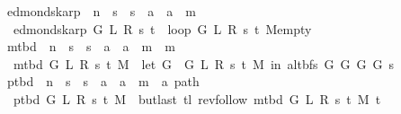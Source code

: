\begin{isabellebody}
\ edmonds{\isacharunderscore}{\kern0pt}karp\ {\isacharcolon}{\kern0pt}{\isacharcolon}{\kern0pt}\ {\isachardoublequoteopen}{\isacharprime}{\kern0pt}n\ {\isasymRightarrow}\ {\isacharprime}{\kern0pt}s\ {\isasymRightarrow}\ {\isacharprime}{\kern0pt}s\ {\isasymRightarrow}\ {\isacharprime}{\kern0pt}a\ {\isasymRightarrow}\ {\isacharprime}{\kern0pt}a\ {\isasymRightarrow}\ {\isacharprime}{\kern0pt}m{\isachardoublequoteclose}\ \isanewline
\ \ {\isachardoublequoteopen}edmonds{\isacharunderscore}{\kern0pt}karp\ G\ L\ R\ s\ t\ {\isasymequiv}\ loop{\isacharprime}{\kern0pt}\ G\ L\ R\ s\ t\ M{\isacharunderscore}{\kern0pt}empty{\isachardoublequoteclose}\isanewline
\isanewline
\isanewline
{}\isamarkupfalse%
\ m{\isacharunderscore}{\kern0pt}tbd\ {\isacharcolon}{\kern0pt}{\isacharcolon}{\kern0pt}\ {\isachardoublequoteopen}{\isacharprime}{\kern0pt}n\ {\isasymRightarrow}\ {\isacharprime}{\kern0pt}s\ {\isasymRightarrow}\ {\isacharprime}{\kern0pt}s\ {\isasymRightarrow}\ {\isacharprime}{\kern0pt}a\ {\isasymRightarrow}\ {\isacharprime}{\kern0pt}a\ {\isasymRightarrow}\ {\isacharprime}{\kern0pt}m\ {\isasymRightarrow}\ {\isacharprime}{\kern0pt}m{\isachardoublequoteclose}\ \isanewline
\ \ {\isachardoublequoteopen}m{\isacharunderscore}{\kern0pt}tbd\ G\ L\ R\ s\ t\ M\ {\isasymequiv}\ let\ G{}\ {\isacharequal}{\kern0pt}\ G{}\ L\ R\ s\ t\ M\ in\ alt{\isacharunderscore}{\kern0pt}bfs\ {\isacharparenleft}{\kern0pt}G{}\ G\ G{}{\isacharparenright}{\kern0pt}\ G{}\ s{\isachardoublequoteclose}\isanewline
\isanewline
\isanewline
{}\isamarkupfalse%
\ p{\isacharunderscore}{\kern0pt}tbd\ {\isacharcolon}{\kern0pt}{\isacharcolon}{\kern0pt}\ {\isachardoublequoteopen}{\isacharprime}{\kern0pt}n\ {\isasymRightarrow}\ {\isacharprime}{\kern0pt}s\ {\isasymRightarrow}\ {\isacharprime}{\kern0pt}s\ {\isasymRightarrow}\ {\isacharprime}{\kern0pt}a\ {\isasymRightarrow}\ {\isacharprime}{\kern0pt}a\ {\isasymRightarrow}\ {\isacharprime}{\kern0pt}m\ {\isasymRightarrow}\ {\isacharprime}{\kern0pt}a\ path{\isachardoublequoteclose}\ \isanewline
\ \ {\isachardoublequoteopen}p{\isacharunderscore}{\kern0pt}tbd\ G\ L\ R\ s\ t\ M\ {\isasymequiv}\ butlast\ {\isacharparenleft}{\kern0pt}tl\ {\isacharparenleft}{\kern0pt}rev{\isacharunderscore}{\kern0pt}follow\ {\isacharparenleft}{\kern0pt}m{\isacharunderscore}{\kern0pt}tbd\ G\ L\ R\ s\ t\ M{\isacharparenright}{\kern0pt}\ t{\isacharparenright}{\kern0pt}{\isacharparenright}{\kern0pt}{\isachardoublequoteclose}\isanewline
\isanewline

\end{isabellebody}

